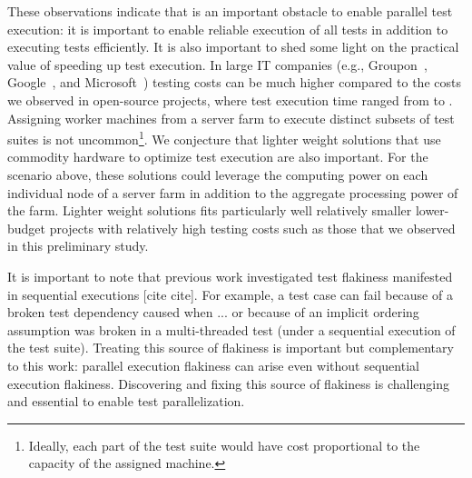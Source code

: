 These observations indicate that \pef{} is an important obstacle to
enable parallel test execution: it is important to enable reliable
execution of all tests in addition to executing tests efficiently.  It
is also important to shed some light on the practical value of
speeding up test execution.  In large IT companies (e.g.,
Groupon~, Google~, and Microsoft~)
testing costs can be much higher compared to the costs we observed in
open-source projects, where test execution time ranged from 
to .  Assigning worker machines from a server farm to execute
distinct subsets of test suites is not
uncommon\footnote{Ideally, each part of the test suite
  would have cost proportional to the capacity of the assigned
  machine.}.  We conjecture that lighter weight solutions that use
commodity hardware to optimize test execution are also important.  For
the scenario above, these solutions could leverage the computing power
on each individual node of a server farm in addition to the aggregate
processing power of the farm.  Lighter weight solutions fits
particularly well relatively smaller lower-budget projects with
relatively high testing costs such as those that we observed in this
preliminary study.

It is important to note that previous work investigated test flakiness
manifested in sequential executions [cite cite].  For example, a test
case can fail because of a broken test dependency caused when ... or
because of an implicit ordering assumption was broken in a
multi-threaded test (under a sequential execution of the test suite).
Treating this source of flakiness is important but complementary to
this work: parallel execution flakiness can arise even without
sequential execution flakiness.  Discovering and fixing this source of
flakiness is challenging and essential to enable test parallelization.

